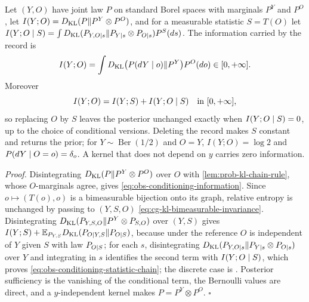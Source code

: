 Let $(Y,O)$ have joint law $P$ on standard Borel spaces with marginals $P^Y$ and
$P^O$, let $I(Y;O)=D_{\mathrm{KL}}(P\Vert P^Y\otimes P^O)$, and for a measurable statistic
$S=T(O)$ let $I(Y;O\mid S)=\int D_{\mathrm{KL}}(P_{Y,O\mid s}\Vert P_{Y\mid s}\otimes P_{O\mid s})P^S(ds)$.
The information carried by the record is
\begin{equation}
I(Y;O)=\int D_{\mathrm{KL}}\bigl(P(dY\mid o)\Vert P^Y\bigr)P^O(do)\in[0,+\infty].
\label{eq:obs-conditioning-information}
\end{equation}
Moreover
\begin{equation}
I(Y;O)=I(Y;S)+I(Y;O\mid S)
\quad\text{in }[0,+\infty],
\label{eq:obs-conditioning-statistic-chain}
\end{equation}
so replacing $O$ by $S$ leaves the posterior unchanged exactly when
$I(Y;O\mid S)=0$, up to the choice of conditional versions. Deleting the record
makes $S$ constant and returns the prior; for
$Y\sim\operatorname{Ber}(1/2)$ and $O=Y$, $I(Y;O)=\log2$ and
$P(dY\mid O=o)=\delta_o$. A kernel that does not depend on $y$ carries zero
information. 

\noindent\emph{Proof.}
Disintegrating $D_{\mathrm{KL}}(P\Vert P^Y\otimes P^O)$ over $O$ with
\cref{lem:prob-kl-chain-rule}, whose $O$-marginals agree, gives
\eqref{eq:obs-conditioning-information}. Since $o\mapsto(T(o),o)$ is a
bimeasurable bijection onto its graph, relative entropy is unchanged by passing
to $(Y,S,O)$ \eqref{eq:cg-kl-bimeasurable-invariance}. Disintegrating
$D_{\mathrm{KL}}(P_{Y,S,O}\Vert P^Y\otimes P_{S,O})$ over $(Y,S)$ gives
$I(Y;S)+\mathbb E_{P_{Y,S}}D_{\mathrm{KL}}(P_{O\mid Y,S}\Vert P_{O\mid S})$, because under the
reference $O$ is independent of $Y$ given $S$ with law $P_{O\mid S}$; for
each $s$, disintegrating
$D_{\mathrm{KL}}(P_{Y,O\mid s}\Vert P_{Y\mid s}\otimes P_{O\mid s})$ over $Y$ and
integrating in $s$ identifies the second term with $I(Y;O\mid S)$, which
proves \eqref{eq:obs-conditioning-statistic-chain}; the discrete case is
\citet[Sec.~2.5]{CoverThomas2006}. Posterior sufficiency is the vanishing of
the conditional term, the Bernoulli values are direct, and a $y$-independent
kernel makes $P=P^Y\otimes P^O$. \hfill$\square$

